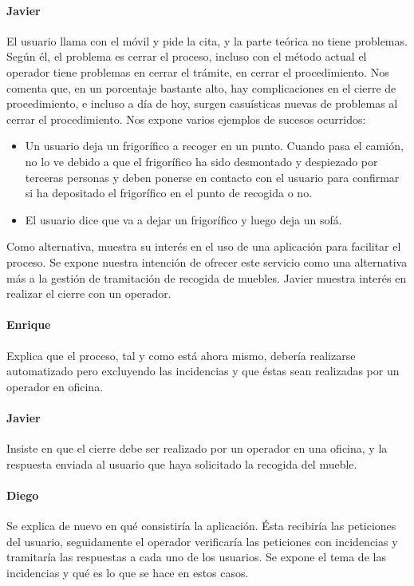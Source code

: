 \paragraph{Javier} El usuario llama con el móvil y pide la cita, y la parte teórica no tiene problemas. Según él, el problema es cerrar el proceso, incluso con el método actual el operador tiene problemas en cerrar el trámite, en cerrar el procedimiento. Nos comenta que, en un porcentaje bastante alto, hay complicaciones en el cierre de procedimiento, e incluso a día de hoy, surgen casuísticas nuevas de problemas al cerrar el procedimiento. Nos expone varios ejemplos de sucesos ocurridos:
\begin{itemize}
\item Un usuario deja un frigorífico a recoger en un punto. Cuando pasa el camión, no lo ve debido a que el frigorífico ha sido desmontado y despiezado por terceras personas y deben ponerse en contacto con el usuario para confirmar si ha depositado el frigorífico en el punto de recogida o no.
\item El usuario dice que va a dejar un frigorífico y luego deja un sofá.
\end{itemize}
Como alternativa, muestra su interés en el uso de una aplicación para facilitar el proceso. Se expone nuestra intención de ofrecer este servicio como una alternativa más a la gestión de tramitación de recogida de muebles. Javier muestra interés en realizar el cierre con un operador.
 
\paragraph{Enrique} Explica que el proceso, tal y como está ahora mismo, debería realizarse automatizado pero excluyendo las incidencias y que éstas sean realizadas por un operador en oficina.
 
\paragraph{Javier} Insiste en que el cierre debe ser realizado por un operador en una oficina, y la respuesta enviada al usuario que haya solicitado la recogida del mueble.
 
\paragraph{Diego} Se explica de nuevo en qué consistiría la aplicación. Ésta recibiría las peticiones del usuario, seguidamente el operador verificaría las peticiones con incidencias y tramitaría las respuestas a cada uno de los usuarios. Se expone el tema de las incidencias y qué es lo que se hace en estos casos.
 
